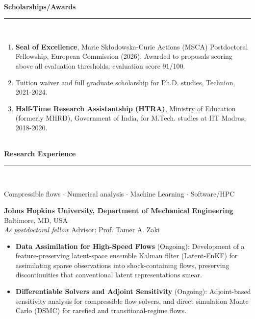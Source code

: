 \ \\[2mm]
\noindent \textbf{\large{Scholarships/Awards}}\\[-2.5mm]
\noindent\rule{\textwidth}{0.4pt} \\[-5mm]
\begin{enumerate}[itemsep=-1mm]
    \item \textbf{Seal of Excellence}, Marie Skłodowska-Curie Actions (MSCA) Postdoctoral Fellowship, European Commission (2026). Awarded to proposals scoring above all evaluation thresholds; evaluation score 91/100.
    \item Tuition waiver and full graduate scholarship for Ph.D. studies, Technion, 2021-2024.
    \item \textbf{Half-Time Research Assistantship (HTRA)}, Ministry of Education (formerly MHRD), Government of India, for M.Tech. studies at IIT Madras, 2018-2020.
\end{enumerate}

\ \\[2mm]
\noindent \textbf{\large{Research Experience}}\\[-2.5mm]
\noindent\rule{\textwidth}{0.4pt} \\[-5mm]
\begin{center}
    \noindent {} Compressible flows $\cdot$
     Numerical analysis $\cdot$ 
     Machine Learning $\cdot$
     Software/HPC \\
\end{center}

\noindent \textbf{Johns Hopkins University, Department of Mechanical Engineering} \hfill Baltimore, MD, USA\\
\noindent \textit{As postdoctoral fellow} \hfill Advisor: Prof. Tamer A. Zaki \\[-5mm]

\begin{itemize}[itemsep=0pt, topsep=5pt, label=]
    \item \textbf{Data Assimilation for High-Speed Flows} (Ongoing): Development of a feature-preserving latent-space ensemble Kalman filter (Latent-EnKF) for assimilating sparse observations into shock-containing flows, preserving discontinuities that conventional latent representations smear.
\end{itemize}
\begin{itemize}[itemsep=0pt, topsep=0pt, label=]
    \item \textbf{Differentiable Solvers and Adjoint Sensitivity} (Ongoing): Adjoint-based sensitivity analysis for compressible flow solvers, and direct simulation Monte Carlo (DSMC) for rarefied and transitional-regime flows. \\
\end{itemize}

